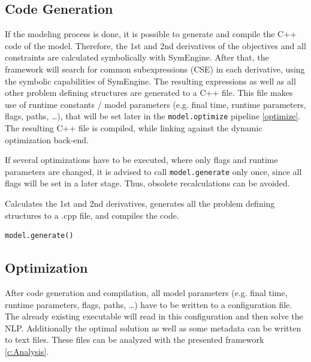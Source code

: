 \documentclass[12pt]{article}
\begin{document}
\subsection{Code Generation}

If the modeling process is done, it is possible to generate and compile the C++ code of the
model.
Therefore, the 1st and 2nd derivatives of the objectives and all constraints
are calculated symbolically with SymEngine. After that, the framework will
search for common subexpressions (CSE) in each derivative, using the symbolic
capabilities of SymEngine. The resulting expressions as well as all other
problem defining structures are generated to a C++ file. This file makes
use of runtime constants / model parameters (e.g. final time, runtime parameters, flags, paths,
\ldots), that will be set later in the \texttt{model.optimize} pipeline
\eqref{optimize}. The resulting C++ file is
compiled, while linking against the dynamic optimization back-end. 

If several optimizations have to be executed, where only flags and runtime
parameters are changed, it is advised to call \texttt{model.generate} only
once, since all flags will be set in a later stage. Thus, obsolete
recalculations can be avoided.

\begin{mdframed}[backgroundcolor=gray!10, roundcorner=10pt,
		linewidth=1pt]

	Calculates the 1st and 2nd derivatives, generates all the problem
	defining structures to a .cpp file, and compiles the code.

	\begin{lstlisting}
model.generate()
\end{lstlisting}

\end{mdframed}

\subsection{Optimization}
After code generation and compilation, all model parameters (e.g. final time, runtime
parameters, flags, paths, \ldots) have to be written to a configuration file. 
The already existing executable will read in this configuration and then solve the NLP. Additionally the optimal solution
as well as some metadata can be written to text files. These files can be
analyzed with the presented framework \eqref{c:Analysis}.
\end{document}
